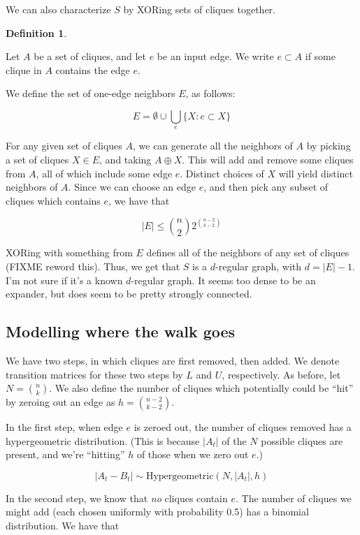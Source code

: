 \documentclass[12pt]{article}
\theoremstyle{definition}
\newtheorem{defn}{Definition}[section]
\begin{document}
We can also characterize $S$ by XORing sets of cliques together.

\begin{defn} \label{def:oneEdgeNeighbors}

Let $A$ be a set of cliques, and let $e$ be an input edge. We write
$e \subset A$ if some clique in $A$ contains the edge $e$.

We define the set of one-edge neighbors $E$, as follows:

\[
E = \emptyset \cup \bigcup_e \{ X: e \subset X\}
\]

\end{defn}

For any given set of cliques $A$, we can generate all the neighbors
of $A$ by picking a set of cliques $X \in E$, and taking $A \oplus X$. This will
add and remove some cliques from $A$, all of which include some edge $e$.
Distinct choices of $X$ will yield distinct neighbors of $A$.
Since we can choose an edge $e$, and then pick any subset of cliques which contains
$e$, we have that

\[
|E| \le {n \choose 2} 2^{{n-2} \choose {k-2}}
\]

XORing with something from $E$ defines all of the neighbors of any set of cliques
(FIXME reword this).
Thus, we get that $S$ is a $d$-regular graph, with $d = |E|-1$.
I'm not sure if it's a known $d$-regular graph.
It seems too
dense to be an expander, but does seem to be pretty strongly connected.

\subsection{Modelling where the walk goes}

We have two steps, in which cliques are first removed, then added.
We denote transition matrices for these two steps by $L$ and $U$, respectively.
As before, let $N = {n \choose k}$.
We also define the number of cliques which potentially could be ``hit'' by
zeroing out an edge as $h = {{n-2} \choose {k-2}}$.

In the first step, when edge $e$ is zeroed out, the number of cliques removed has
a hypergeometric distribution. (This is because $|A_t|$ of the $N$ possible cliques
are present, and we're ``hitting'' $h$ of those when we zero out $e$.)

\[
|A_t - B_t| \sim \text{Hypergeometric}(N, |A_t|, h)
\]

In the second step, we know that {\em no} cliques contain $e$. The number of
cliques we might add (each chosen uniformly with probability 0.5) has 
a binomial distribution. We have that
\end{document}
